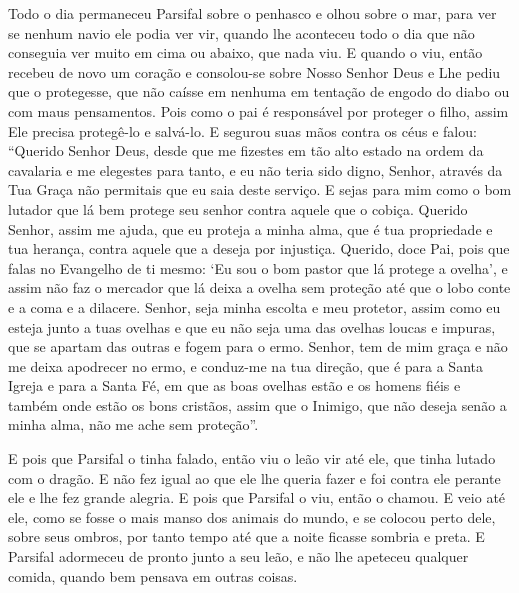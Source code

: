 Todo o dia permaneceu Parsifal sobre o penhasco e olhou sobre o mar, para
ver se nenhum navio ele podia ver vir, quando lhe aconteceu todo o dia que não
conseguia ver muito em cima ou abaixo, que nada viu. E quando o viu, então
recebeu de novo um coração e consolou-se sobre Nosso Senhor Deus e Lhe pediu
que o protegesse, que não caísse em nenhuma em tentação de engodo do diabo ou
com maus pensamentos. Pois como o pai é responsável por proteger o filho, assim
Ele precisa protegê-lo e salvá-lo. E segurou suas mãos contra os céus e falou:
“Querido Senhor Deus, desde que me fizestes em tão alto estado na ordem da
cavalaria e me elegestes para tanto, e eu não teria sido digno, Senhor, através
da Tua Graça não permitais que eu saia deste serviço. E sejas para mim como o
bom lutador que lá bem protege seu senhor contra aquele que o cobiça. Querido
Senhor, assim me ajuda, que eu proteja a minha alma, que é tua propriedade e
tua herança, contra aquele que a deseja por injustiça. Querido, doce Pai, pois
que falas no Evangelho de ti mesmo: ‘Eu sou o bom pastor que lá protege a
ovelha’, e assim não faz o mercador que lá deixa a ovelha sem proteção até que
o lobo conte e a coma e a dilacere. Senhor, seja minha escolta e meu protetor,
assim como eu esteja junto a tuas ovelhas e que eu não seja uma das ovelhas
loucas e impuras, que se apartam das outras e fogem para o ermo. Senhor, tem de
mim graça e não me deixa apodrecer no ermo, e conduz-me na tua direção, que é
para a Santa Igreja e para a Santa Fé, em que as boas ovelhas estão e os homens
fiéis e também onde estão os bons cristãos, assim que o Inimigo, que não deseja
senão a minha alma, não me ache sem proteção”. 

E pois que Parsifal o tinha falado, então viu o leão vir até ele, que tinha
lutado com o dragão. E não fez igual ao que ele lhe queria fazer e foi contra
ele perante ele e lhe fez grande alegria. E pois que Parsifal o viu, então o
chamou. E veio até ele, como se fosse o mais manso dos animais do mundo, e se
colocou perto dele, sobre seus ombros, por tanto tempo até que a noite ficasse
sombria e preta. E Parsifal adormeceu de pronto junto a seu leão, e não lhe
apeteceu qualquer comida, quando bem pensava em outras coisas.

